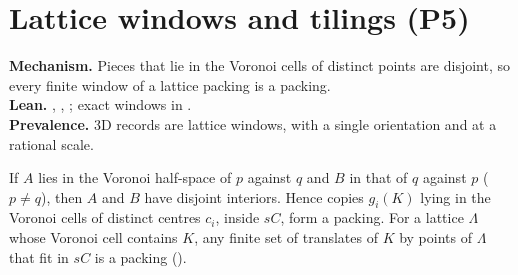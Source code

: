 \documentclass[11pt,a4paper]{article}
\begin{document}
\section{Lattice windows and tilings (P5)}\label{sec:windows}

\begin{summarybox}
\textbf{Mechanism.} Pieces that lie in the Voronoi cells of distinct points are disjoint, so every finite window of a lattice packing is a packing.\\
\textbf{Lean.} , , ; exact windows in .\\
\textbf{Prevalence.} \nLattice{} 3D records are lattice windows, \nLatticeOne{} with a single orientation and \nLatticeRational{} at a rational scale.
\end{summarybox}

\begin{theorem}
If $A$ lies in the Voronoi half-space of $p$ against $q$ and $B$ in that of $q$ against $p$ ($p\ne q$), then $A$ and $B$ have disjoint interiors. Hence copies $g_i(K)$ lying in the Voronoi cells of distinct centres $c_i$, inside $sC$, form a packing. For a lattice $\Lambda$ whose Voronoi cell contains $K$, any finite set of translates of $K$ by points of $\Lambda$ that fit in $sC$ is a packing ().
\end{theorem}
\end{document}
